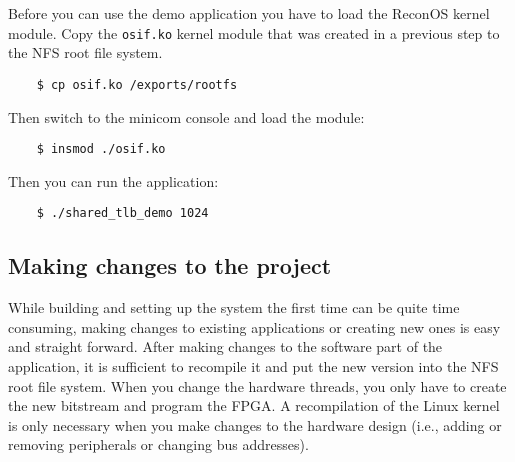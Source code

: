 \documentclass[DIV15,a4paper]{scrartcl}
\begin{document}
Before you can use the demo application you have to load the ReconOS kernel module. Copy the \texttt{osif.ko} kernel module that was created in a previous step to the NFS root file
system.

\begin{verbatim}
	$ cp osif.ko /exports/rootfs
\end{verbatim}


Then switch to the minicom console and load the module:

\begin{verbatim}
	$ insmod ./osif.ko
\end{verbatim}
 
Then you can run the application:

\begin{verbatim}
	$ ./shared_tlb_demo 1024
\end{verbatim}

\subsection{Making changes to the project}

While building and setting up the system the first time can be quite time consuming, making changes to existing applications or creating new ones is easy and straight forward.
After making changes to the software part of the application, it is sufficient to recompile it and put the new version into the NFS root file system. When you change the hardware threads, you
only have to create the new bitstream and program the FPGA. A recompilation of the Linux kernel is only necessary when you make changes to the hardware design (i.e., adding
 or removing peripherals or changing bus addresses).
\end{document}
